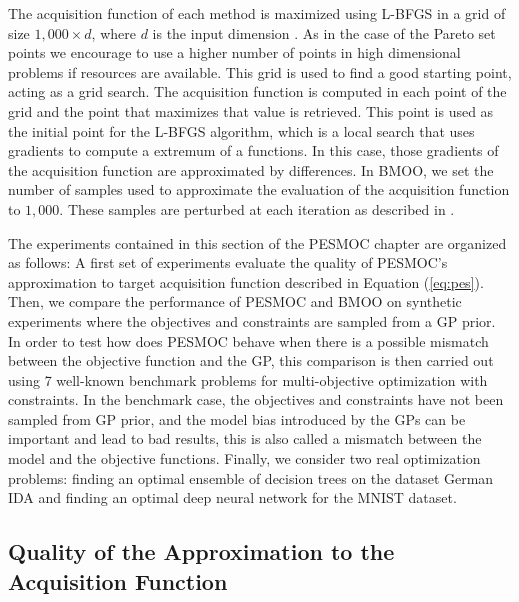 The acquisition function of each method is maximized using L-BFGS in a grid of size $1,000 \times d$, where $d$ is the
input dimension \citep{zhu1997algorithm}. As in the case of the Pareto set points we encourage to use a higher number of points in high dimensional problems if resources are available. This grid is used to find a good starting point, acting as a grid search. The acquisition function is computed in each point of the grid and the point that maximizes that value is retrieved. This point is used as the initial point for the L-BFGS algorithm, which is a local search that uses gradients to compute a extremum of a functions. In this case, those gradients of the acquisition function are approximated by differences. In BMOO, we set the number of samples used to approximate the evaluation of
the acquisition function to $1,000$. These samples are perturbed at each iteration as described in \citep{feliot2015bayesian}.

The experiments contained in this section of the PESMOC chapter are organized as follows: A first set of experiments evaluate
the quality of PESMOC's approximation to target acquisition function described in Equation (\ref{eq:pes}).
Then, we compare the performance of PESMOC and BMOO on synthetic experiments where the objectives and
constraints are sampled from a GP prior. In order to test how does PESMOC behave when there is a possible mismatch between 
the objective function and the GP, this comparison is then carried out using 7 well-known benchmark
problems for multi-objective optimization with constraints. In the benchmark case, the objectives and constraints have not been sampled from GP prior, and the model bias introduced by the GPs can be important and lead to bad results, this is also called a mismatch between the model and the objective functions. Finally, we consider two real optimization problems: finding an optimal ensemble of decision trees on the dataset German IDA and finding an optimal deep neural network for the MNIST dataset.

\subsection{Quality of the Approximation to the Acquisition Function}

